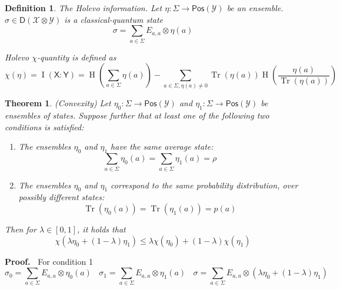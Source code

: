 \documentclass[aps,pra,onecolumn,notitlepage,superscriptaddress]{revtex4-1}
\newcommand{\reg}[1]{\mathsf{#1}}
\newcommand{\spc}[1]{\mathcal{#1}}
\newcommand{\Pos}{\mathsf{Pos}}
\newcommand{\D}{\mathsf{D}}
\newcommand{\Tr}{\operatorname{Tr}}
\newcommand{\op}[1]{\operatorname{#1}}
\newtheorem{theo}{Theorem}
\newtheorem{defi}{Definition}
\def\Proof{{\bf Proof.~}}
\begin{document}
    \begin{defi}
        The Holevo information. Let $\eta : \Sigma \to \Pos(\spc Y)$ be an ensemble. $\sigma \in \D(\spc X \otimes \spc Y)$ is a classical-quantum state
        \begin{equation}
            \sigma = \sum_{a \in \Sigma} E_{a,a} \otimes \eta(a)
        \end{equation}

        Holevo $\chi$-quantity is defined as
        \begin{equation}
            \chi(\eta) = \op I(\reg X : \reg Y) = \op H\left( \sum_{a \in \Sigma} \eta(a) \right) - \sum_{a \in \Sigma, \eta(a) \neq 0} \Tr(\eta(a)) \op H \left( \frac{\eta(a)}{\Tr(\eta(a))} \right)
        \end{equation}
    \end{defi}

    \begin{theo}
        (Convexity) Let $\eta_0 : \Sigma \to \Pos(\spc Y)$ and $\eta_1 : \Sigma \to \Pos(\spc Y)$ be ensembles of states. Suppose further that at least one of the following two conditions is satisfied:
        \begin{enumerate}
            \item The ensembles $\eta_0$ and $\eta_1$ have the same average state:
            \begin{equation}
                \sum_{a \in \Sigma} \eta_0(a) = \sum_{a \in \Sigma} \eta_1(a) = \rho
            \end{equation}
            \item The ensembles $\eta_0$ and $\eta_1$ correspond to the same probability distribution, over possibly different states:
            \begin{equation}
                \Tr(\eta_0(a)) = \Tr(\eta_1(a)) = p(a)
            \end{equation}
        \end{enumerate}

        Then for $\lambda \in [0,1]$, it holds that
        \begin{equation}
            \chi(\lambda \eta_0 + (1-\lambda)\eta_1) \leq \lambda \chi(\eta_0) + (1-\lambda) \chi(\eta_1)
        \end{equation}
    \end{theo}

    \Proof
    For condition 1
    \begin{equation}
        \sigma_0 = \sum_{a \in \Sigma} E_{a,a} \otimes \eta_0(a) \ \ \ \ 
        \sigma_1 = \sum_{a \in \Sigma} E_{a,a} \otimes \eta_1(a) \ \ \ \ 
        \sigma = \sum_{a \in \Sigma} E_{a,a} \otimes (\lambda \eta_0 + (1-\lambda)\eta_1)
    \end{equation}
\end{document}
